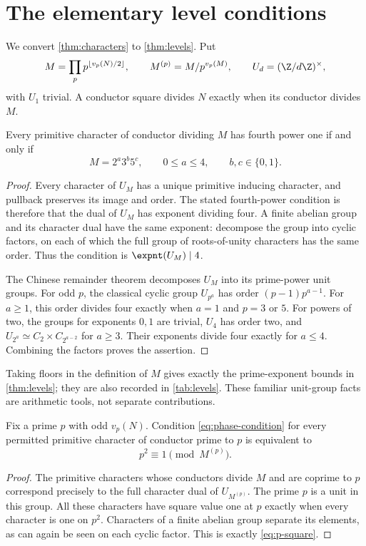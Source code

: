 \section{The elementary level conditions}\label{sec:arithmetic}

We convert \cref{thm:characters} to \cref{thm:levels}.
Put
\[
 M=\prod_p p^{\lfloor v_p(N)/2\rfloor},\qquad
 M^{(p)}=M/p^{v_p(M)},\qquad U_d=(\Z/d\Z)^\times,
\]
with \(U_1\) trivial. A conductor square divides \(N\)
exactly when its conductor divides \(M\).

\begin{lemma}\label{lem:unit-exponent}
Every primitive character of conductor dividing \(M\) has
fourth power one if and only if
\[
 M=2^a3^b5^c,\qquad 0\le a\le4,\qquad b,c\in\{0,1\}.
\]
\end{lemma}
\begin{proof}
Every character of \(U_M\) has a unique primitive inducing
character, and pullback preserves its image and order.
The stated fourth-power condition is therefore that the dual
of \(U_M\) has exponent dividing four. A finite abelian group
and its character dual have the same exponent: decompose the
group into cyclic factors, on each of which the full group of
roots-of-unity characters has the same order. Thus the condition
is \(\expnt(U_M)\mid4\).

The Chinese remainder theorem decomposes \(U_M\) into its
prime-power unit groups. For odd \(p\), the classical cyclic
group \(U_{p^a}\) has order \((p-1)p^{a-1}\). For \(a\ge1\),
this order divides four exactly when \(a=1\) and \(p=3\) or \(5\).
For powers of two, the groups for exponents \(0,1\) are trivial,
\(U_4\) has order two, and
\(U_{2^a}\simeq C_2\times C_{2^{a-2}}\) for \(a\ge3\).
Their exponents divide four exactly for \(a\le4\).
Combining the factors proves the assertion.
\end{proof}

Taking floors in the definition of \(M\) gives exactly the
prime-exponent bounds in \cref{thm:levels}; they are also recorded
in \cref{tab:levels}. These familiar unit-group facts are
arithmetic tools, not separate contributions.
\LevelTable

\begin{lemma}\label{lem:extra-prime}
Fix a prime \(p\) with odd \(v_p(N)\).
Condition \eqref{eq:phase-condition} for every permitted
primitive character of conductor prime to \(p\) is equivalent to
\begin{equation}\label{eq:p-square}
 p^2\equiv1\pmod{M^{(p)}}.
\end{equation}
\end{lemma}
\begin{proof}
The primitive characters whose conductors divide \(M\) and are
coprime to \(p\) correspond precisely to the full character
dual of \(U_{M^{(p)}}\). The prime \(p\) is a unit in this group.
All these characters have square value one at \(p\) exactly
when every character is one on \(p^2\). Characters of a finite
abelian group separate its elements, as can again be seen on
each cyclic factor. This is exactly \eqref{eq:p-square}.
\end{proof}

